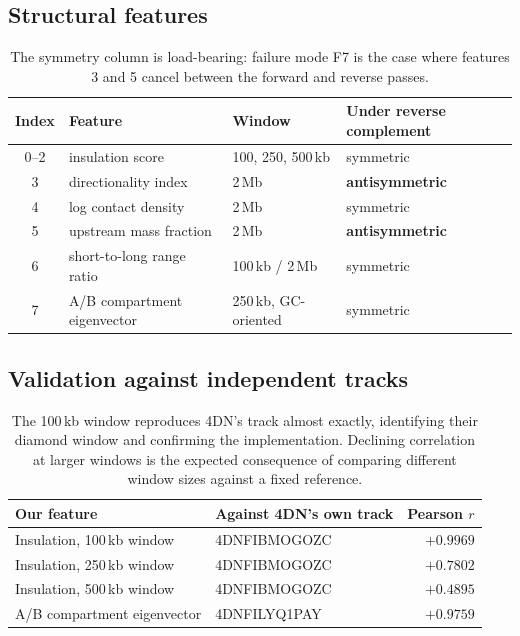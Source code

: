 \documentclass[11pt,a4paper]{article}
\begin{document}
\subsection{Structural features}

\begin{table}[h]\centering
\begin{tabular}{@{}clll@{}}
\toprule
Index & Feature & Window & Under reverse complement \\
\midrule
0--2 & insulation score & 100, 250, 500\,kb & symmetric \\
3 & directionality index & 2\,Mb & \textbf{antisymmetric} \\
4 & log contact density & 2\,Mb & symmetric \\
5 & upstream mass fraction & 2\,Mb & \textbf{antisymmetric} \\
6 & short-to-long range ratio & 100\,kb / 2\,Mb & symmetric \\
7 & A/B compartment eigenvector & 250\,kb, GC-oriented & symmetric \\
\bottomrule
\end{tabular}
\caption{The symmetry column is load-bearing: failure mode F7 is the case where
features 3 and 5 cancel between the forward and reverse passes.}
\end{table}

\subsection{Validation against independent tracks}

\begin{table}[h]\centering
\begin{tabular}{@{}llr@{}}
\toprule
Our feature & Against 4DN's own track & Pearson $r$ \\
\midrule
Insulation, 100\,kb window & 4DNFIBMOGOZC & $+0.9969$ \\
Insulation, 250\,kb window & 4DNFIBMOGOZC & $+0.7802$ \\
Insulation, 500\,kb window & 4DNFIBMOGOZC & $+0.4895$ \\
A/B compartment eigenvector & 4DNFILYQ1PAY & $+0.9759$ \\
\bottomrule
\end{tabular}
\caption{The 100\,kb window reproduces 4DN's track almost exactly, identifying
their diamond window and confirming the implementation. Declining correlation at
larger windows is the expected consequence of comparing different window sizes
against a fixed reference.}
\end{table}
\end{document}
